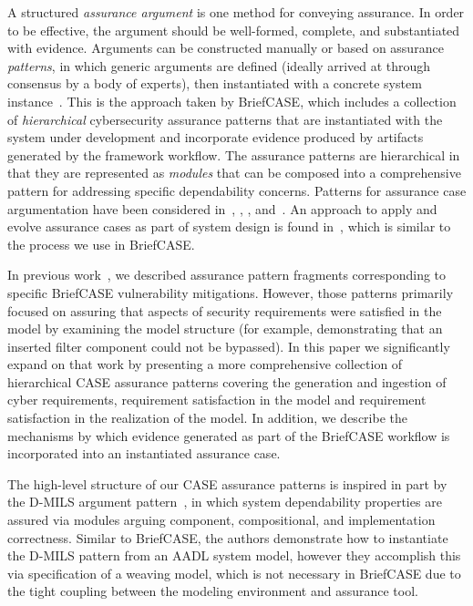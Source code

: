 A structured \textit{assurance argument} is one method for conveying assurance.
In order to be effective, the argument should be well-formed, complete, and substantiated with evidence.    
Arguments can be constructed manually or based on assurance \textit{patterns}, in which generic arguments are defined (ideally arrived at through consensus by a body of experts), then instantiated with a concrete system instance~\cite{Kelly97:patterns}.  This is the approach taken by BriefCASE, which includes a collection of \textit{hierarchical} cybersecurity assurance patterns that are instantiated with the system under development and incorporate evidence produced by artifacts generated by the framework workflow.  The assurance patterns are hierarchical in that they are represented as \textit{modules} that can be composed into a comprehensive pattern for addressing specific dependability concerns.
%
Patterns for assurance case argumentation have been considered in~\cite{Denney13:pattern}, \cite{Hawkins11:pattern}, \cite{Kelly97:patterns}, and~\cite{Sun11:pattern}. An approach to apply and evolve assurance cases as part of system design is found in~\cite{Graydon07:dev}, which is similar to the process we use in BriefCASE.

In previous work~\cite{resolute-destion}, we described assurance pattern fragments corresponding to specific BriefCASE vulnerability mitigations.  However, those patterns primarily focused on assuring that aspects of security requirements were satisfied in the model by examining the model structure (for example, demonstrating that an inserted filter component could not be bypassed).  
%
In this paper we significantly expand on that work by presenting a more comprehensive collection of hierarchical CASE assurance patterns covering the generation and ingestion of cyber requirements, requirement satisfaction in the model and requirement satisfaction in the realization of the model.  In addition, we describe the mechanisms by which evidence generated as part of the BriefCASE workflow is incorporated into an instantiated assurance case.

The high-level structure of our CASE assurance patterns is inspired in part by the D-MILS argument pattern~\cite{dmils}, in which system dependability properties are assured via modules arguing component, compositional, and implementation correctness.  Similar to BriefCASE, the authors demonstrate how to instantiate the D-MILS pattern from an AADL system model, however they accomplish this via specification of a weaving model, which is not necessary in BriefCASE due to the tight coupling between the modeling environment and assurance tool.

